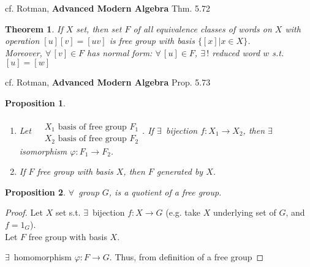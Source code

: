 \documentclass[twoside,landscape]{amsart}
\theoremstyle{plain}
\newtheorem{theorem}{Theorem}
\newtheorem{proposition}{Proposition}
\theoremstyle{definition}
\theoremstyle{remark}
\begin{document}
\begin{multicols*}{2}
cf. Rotman, \textbf{Advanced Modern Algebra} Thm. 5.72 
\begin{theorem}
If $X$ set, then set $F$ of all equivalence classes of words on $X$ with operation $[u][v] = [uv]$ is free group with basis $\lbrace [x] | x \in X \rbrace$.  \\
Moreover, $\forall \, [v] \in F$ has normal form: $\forall \, [u] \in F$, $\exists \, !$ reduced word $w$ s.t. $[u]= [w]$
\end{theorem}

cf. Rotman, \textbf{Advanced Modern Algebra} Prop. 5.73 
\begin{proposition}
  \begin{enumerate}
\item Let $\begin{aligned} & \quad \\ 
  & X_1 \text{ basis of free group } F_1 \\
  & X_2 \text{ basis of free group } F_2 \end{aligned}$.  If $\exists \, $ bijection $f:X_1 \to X_2$, then $\exists \, $ isomorphism $\varphi : F_1 \to F_2$.  
\item If $F$ free group with basis $X$, then $F$ generated by $X$.  
\end{enumerate}
\end{proposition}




\begin{proposition}
  $\forall \, $ group $G$, is a quotient of a free group.  
\end{proposition}

\begin{proof}
  Let $X$ set s.t. $\exists \, $ bijection $f:X \to G$ (e.g. take $X$ underlying set of $G$, and $f=1_G$).  \\
Let $F$ free group with basis $X$.  

$\exists \, $ homomorphism $\varphi :F\to G$.   Thus, from definition of a free group




\end{proof}
\end{multicols*}
\end{document}
